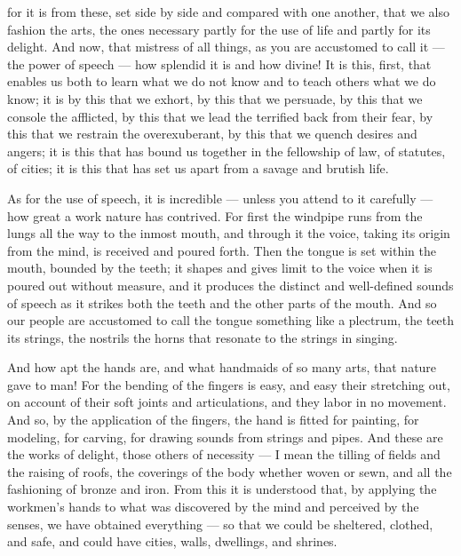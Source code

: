  for it is from these, set side by side and compared with one another, that we also fashion the arts, the ones necessary partly for the use of life and partly for its delight. And now, that mistress of all things, as you are accustomed to call it — the power of speech — how splendid it is and how divine! It is this, first, that enables us both to learn what we do not know and to teach others what we do know; it is by this that we exhort, by this that we persuade, by this that we console the afflicted, by this that we lead the terrified back from their fear, by this that we restrain the overexuberant, by this that we quench desires and angers; it is this that has bound us together in the fellowship of law, of statutes, of cities; it is this that has set us apart from a savage and brutish life.

 As for the use of speech, it is incredible — unless you attend to it carefully — how great a work nature has contrived. For first the windpipe runs from the lungs all the way to the inmost mouth, and through it the voice, taking its origin from the mind, is received and poured forth. Then the tongue is set within the mouth, bounded by the teeth; it shapes and gives limit to the voice when it is poured out without measure, and it produces the distinct and well-defined sounds of speech as it strikes both the teeth and the other parts of the mouth. And so our people are accustomed to call the tongue something like a plectrum, the teeth its strings, the nostrils the horns that resonate to the strings in singing.

 And how apt the hands are, and what handmaids of so many arts, that nature gave to man! For the bending of the fingers is easy, and easy their stretching out, on account of their soft joints and articulations, and they labor in no movement. And so, by the application of the fingers, the hand is fitted for painting, for modeling, for carving, for drawing sounds from strings and pipes. And these are the works of delight, those others of necessity — I mean the tilling of fields and the raising of roofs, the coverings of the body whether woven or sewn, and all the fashioning of bronze and iron. From this it is understood that, by applying the workmen's hands to what was discovered by the mind and perceived by the senses, we have obtained everything — so that we could be sheltered, clothed, and safe, and could have cities, walls, dwellings, and shrines.


